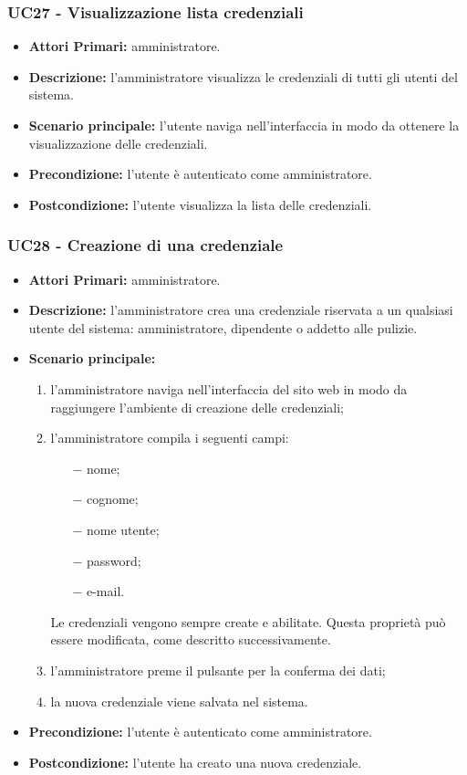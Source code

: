 \subsubsection{ UC27 - Visualizzazione lista credenziali}
\begin{itemize}
	\item\textbf{Attori Primari:} 
	amministratore.
	\item\textbf{Descrizione:} 
	l'amministratore visualizza le credenziali di tutti gli utenti del sistema.
	\item\textbf{Scenario principale:} 
	l'utente naviga nell'interfaccia in modo da ottenere la visualizzazione delle credenziali.
	\item\textbf{Precondizione:} 
	l'utente è autenticato come amministratore.
	\item\textbf{Postcondizione:}
	l'utente visualizza la lista delle credenziali.
\end{itemize}

\subsubsection{ UC28 - Creazione di una credenziale}
\begin{itemize}
	\item\textbf{Attori Primari:}
	amministratore.
	\item\textbf{Descrizione:} 
	l'amministratore crea una credenziale riservata a un qualsiasi utente del sistema: amministratore, dipendente o addetto alle pulizie.
	\item\textbf{Scenario principale:} 
	\begin{enumerate}
		\item l'amministratore naviga nell'interfaccia del sito web in modo da raggiungere l'ambiente di creazione delle credenziali;
		\item l'amministratore compila i seguenti campi:
		\begin{itemize}
			\item[$-$] nome;
			\item[$-$] cognome;
			\item[$-$] nome utente;
			\item[$-$] password;
			\item[$-$] e-mail.
		\end{itemize}
		Le credenziali vengono sempre create e abilitate. Questa proprietà può essere modificata, come descritto successivamente.
		\item l'amministratore preme il pulsante per la conferma dei dati;
		\item la nuova credenziale viene salvata nel sistema.
	\end{enumerate}
	\item\textbf{Precondizione:} 
	l'utente è autenticato come amministratore.
	\item\textbf{Postcondizione:}
	l'utente ha creato una nuova credenziale.
\end{itemize}

